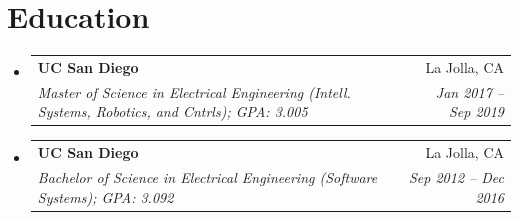 \documentclass[letterpaper,11pt]{article}
\makeatletter
\newcommand{\resumeSubheading}[4]{
  \vspace{-1pt}\item
    \begin{tabular*}{0.97\textwidth}[t]{l@{\extracolsep{\fill}}r}
      \textbf{#1} & #2 \\
      \textit{\small#3} & \textit{\small #4} \\
    \end{tabular*}\vspace{-5pt}
}
\newcommand{\resumeSubHeadingListStart}{\begin{itemize}[leftmargin=*]}
\newcommand{\resumeSubHeadingListEnd}{\end{itemize}}
\makeatother
\begin{document}
%

\section{Education}
  \resumeSubHeadingListStart
    \resumeSubheading
      {UC San Diego}{La Jolla, CA}
      {Master of Science in Electrical Engineering (Intell. Systems, Robotics, and Cntrls); GPA: 3.005}{Jan 2017 -- Sep 2019}
    \resumeSubheading
      {UC San Diego}{La Jolla, CA}
      {Bachelor of Science in Electrical Engineering (Software Systems); GPA: 3.092}{Sep 2012 -- Dec 2016}
  \resumeSubHeadingListEnd




\end{document}
